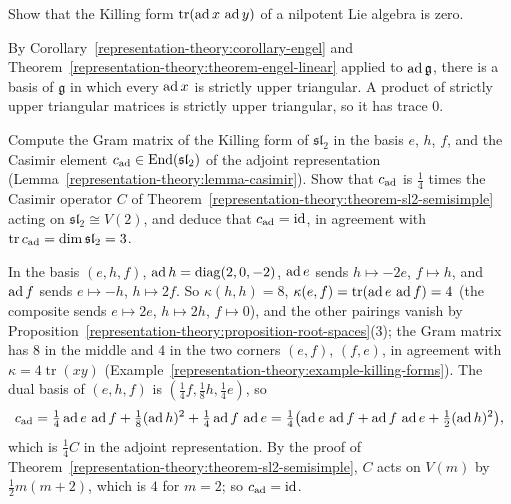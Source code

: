 \begin{exercise}\label{representation-theory:exercise-killing-form-nilpotent}
Show that the Killing form $\operatorname{tr}(\operatorname{ad} x\,\operatorname{ad} y)$ of a nilpotent Lie algebra is zero.
\end{exercise}

\begin{solution}
By Corollary~\ref{representation-theory:corollary-engel} and Theorem~\ref{representation-theory:theorem-engel-linear} applied to $\operatorname{ad}\mathfrak{g}$, there is a basis of
$\mathfrak{g}$ in which every $\operatorname{ad} x$ is strictly upper triangular. A product of strictly upper triangular matrices is strictly upper triangular, so it has trace $0$.
\end{solution}

\begin{exercise}\label{representation-theory:exercise-casimir-sl2}
Compute the Gram matrix of the Killing form of $\mathfrak{sl}_2$ in the basis $e$, $h$, $f$, and the Casimir element $c_{\operatorname{ad}} \in \operatorname{End}(\mathfrak{sl}_2)$ of the adjoint
representation (Lemma~\ref{representation-theory:lemma-casimir}). Show that $c_{\operatorname{ad}}$ is $\frac14$ times the Casimir operator $C$ of Theorem~\ref{representation-theory:theorem-sl2-semisimple}
acting on $\mathfrak{sl}_2 \cong V(2)$, and deduce that $c_{\operatorname{ad}} = \mathrm{id}$, in agreement with $\operatorname{tr}c_{\operatorname{ad}} = \dim\mathfrak{sl}_2 = 3$.
\end{exercise}

\begin{solution}
In the basis $(e, h, f)$, $\operatorname{ad} h = \operatorname{diag}(2, 0, -2)$, $\operatorname{ad} e$ sends $h \mapsto -2e$, $f \mapsto h$, and $\operatorname{ad} f$ sends $e \mapsto -h$, $h \mapsto 2f$. So
$\kappa(h, h) = 8$, $\kappa(e, f) = \operatorname{tr}(\operatorname{ad} e\,\operatorname{ad} f) = 4$ (the composite sends $e \mapsto 2e$, $h \mapsto 2h$, $f \mapsto 0$), and the other pairings vanish by
Proposition~\ref{representation-theory:proposition-root-spaces}(3); the Gram matrix has $8$ in the middle and $4$ in the two corners $(e, f)$, $(f, e)$, in agreement with
$\kappa = 4\operatorname{tr}(xy)$ (Example~\ref{representation-theory:example-killing-forms}). The dual basis of $(e, h, f)$ is $(\frac14f, \frac18h, \frac14e)$, so
\[
c_{\operatorname{ad}} = \tfrac14\operatorname{ad} e\,\operatorname{ad} f + \tfrac18(\operatorname{ad} h)^2 + \tfrac14\operatorname{ad} f\,\operatorname{ad} e = \tfrac14\bigl(\operatorname{ad} e\,\operatorname{ad} f + \operatorname{ad} f\,\operatorname{ad} e + \tfrac12(\operatorname{ad} h)^2\bigr),
\]
which is $\frac14C$ in the adjoint representation. By the proof of Theorem~\ref{representation-theory:theorem-sl2-semisimple}, $C$ acts on $V(m)$ by $\frac12m(m + 2)$, which is $4$ for
$m = 2$; so $c_{\operatorname{ad}} = \mathrm{id}$.
\end{solution}

